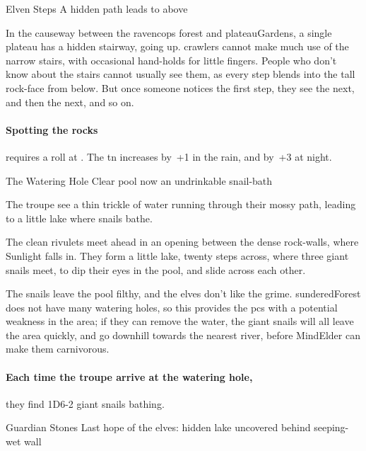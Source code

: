 
{Elven Steps}%
{A hidden path leads to  above}%
\label{hiddenStairs}

In the causeway between the \gls{ravencops} forest and \gls{plateauGardens}, a single plateau has a hidden stairway, going up.
\Glspl{crawler} cannot make much use of the narrow stairs, with occasional hand-holds for little fingers.
People who don't know about the stairs cannot usually see them, as every step blends into the tall rock-face from below.
But once someone notices the first step, they see the next, and then the next, and so on.

\paragraph{Spotting the rocks}
requires a  roll at \tn[12].
The \gls{tn} increases by~+1 in the rain, and by~+3 at night.

{The Watering Hole}%
{Clear pool now an undrinkable snail-bath}%
\label{shadePool}

The troupe see a thin trickle of water running through their mossy path, leading to a little lake where snails bathe.

\begin{boxtext}
  The clean rivulets meet ahead in an opening between the dense rock-walls, where Sunlight falls in.
  They form a little lake, twenty \glspl{step} across, where three giant snails meet, to dip their eyes in the pool, and slide across each other.
\end{boxtext}

The snails leave the pool filthy, and the elves don't like the grime.
\Gls{sunderedForest} does not have many watering holes, so this provides the \glspl{pc} with a potential weakness in the area; if they can remove the  water, the giant snails will all leave the area quickly, and go downhill towards the nearest river, before \gls{MindElder} can make them carnivorous.

\paragraph{Each time the troupe arrive at the watering hole,}
they find 1D6-2 giant snails bathing.

{Guardian Stones}%
{Last hope of the elves: hidden lake uncovered behind seeping-wet wall}%
\label{shadeDamn}

